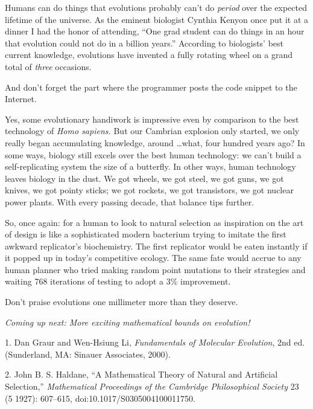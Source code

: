 {
 Humans can do things that evolutions probably
can't do \textit{period} over the expected lifetime of
the universe. As the eminent biologist Cynthia Kenyon once put it at a
dinner I had the honor of attending, ``One grad
student can do things in an hour that evolution could not do in a
billion years.'' According to
biologists' best current knowledge, evolutions have
invented a fully rotating wheel on a grand total of \textit{three}
occasions.}

{
 And don't forget the part where the programmer
posts the code snippet to the Internet.}

{
 Yes, some evolutionary handiwork is impressive even by comparison
to the best technology of \textit{Homo sapiens.} But our Cambrian
explosion only started, we only really began accumulating knowledge,
around \ldots what, four hundred years ago? In some ways, biology still
excels over the best human technology: we can't build a
self-replicating system the size of a butterfly. In other ways, human
technology leaves biology in the dust. We got wheels, we got steel, we
got guns, we got knives, we got pointy sticks; we got rockets, we got
transistors, we got nuclear power plants. With every passing decade,
that balance tips further.}

{
 So, once again: for a human to look to natural selection as
inspiration on the art of design is like a sophisticated modern
bacterium trying to imitate the first awkward
replicator's biochemistry. The first replicator would
be eaten instantly if it popped up in today's
competitive ecology. The same fate would accrue to any human planner
who tried making random point mutations to their strategies and waiting
768 iterations of testing to adopt a 3\% improvement.}

{
 Don't praise evolutions one millimeter more than
they deserve.}

{
 \textit{Coming up next: More exciting mathematical bounds on
evolution!}}

\myendsectiontext


\bigskip

{
 1. Dan Graur and Wen-Hsiung Li, \textit{Fundamentals of Molecular
Evolution}, 2nd ed. (Sunderland, MA: Sinauer Associates, 2000).}

{
 2. John B. S. Haldane, ``A Mathematical Theory of
Natural and Artificial Selection,''
\textit{Mathematical Proceedings of the Cambridge Philosophical
Society} 23 (5 1927): 607--615, doi:10.1017/S0305004100011750.}


